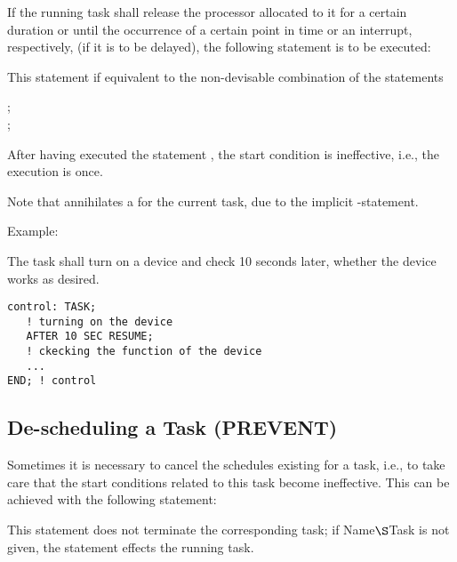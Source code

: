 If the running task shall release the processor allocated to it for a
certain duration or until the occurrence of a certain point in time or an
interrupt, respectively, (if it is to be delayed), the following
statement is to be executed:

\begin{grammarframe}

\end{grammarframe}

This statement if equivalent to the non-devisable combination of
the statements

;\\
;

After having executed the statement 
, the start condition is
ineffective, i.e., the execution is once.

Note that  annihilates a 
for the current task, due to the implicit -statement.

Example:

The task  shall turn on a device and check 10 seconds later,
whether the device works as desired.

\begin{lstlisting}
control: TASK;
   ! turning on the device
   AFTER 10 SEC RESUME;
   ! ckecking the function of the device
   ...
END; ! control
\end{lstlisting}

\subsection{De-scheduling a Task (PREVENT)}    %
\label{sec_prevent}

Sometimes it is necessary to cancel the schedules existing for a task,
i.e., to take care that the start conditions related to this task become
ineffective. This can be achieved with the following statement:

\begin{grammarframe}

\end{grammarframe}

This statement does not terminate the corresponding task; if
Name$\S $Task is not given, the statement effects the running task.

